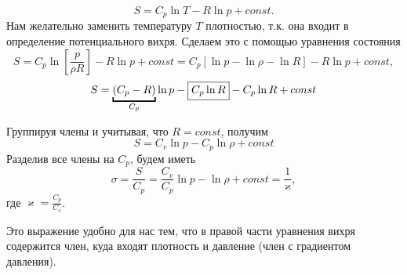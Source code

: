 \begin{equation*}
    S = C_p \ln{T} - R \ln{p} + const.
\end{equation*}
Нам желательно заменить температуру $T$ плотностью, т.к. она входит в определение потенциального вихря. Сделаем это с помощью уравнения состояния 
    \[ S=C_p \ln{ \left[\frac{p}{\rho R} \right] } - R \ln{p} + const = C_p \left[ \ln{p} - \ln{\rho} - \ln{R} \right] - R \ln{p} + const, \]
    \[ S = \ub{(C_p - R)}_{C_p} \ln{p} - \boxed{C_p \tikzmark{z3} \ln{R} } - C_p \ln{R} + co\tikzmark{z4}nst
    \]
Группируя члены и учитывая, что $R=const$, получим
\[
S = C_v \ln{p} - C_p \ln{\rho} + const
\]
Разделив все члены на $C_p$, будем иметь
\begin{equation*}
    \sigma = \frac{S}{C_p} = \frac{C_v}{C_p} \ln{p} - \ln{\rho} + const = \frac{1}{\varkappa} ,
\end{equation*}
где $\varkappa=\frac{C_p}{C_v}$.

Это выражение удобно для нас тем, что в правой части уравнения вихря содержится член, куда входят плотность и давление (член с градиентом давления).

